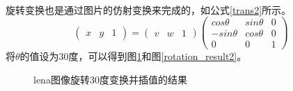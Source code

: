 \documentclass[UTF8]{ctexart}
\newcommand{\upcite}[1]{\textsuperscript{\textsuperscript{\cite{#1}}}}
\begin{document}
旋转变换也是通过图片的仿射变换来完成的，如公式\ref{trans2}所示\upcite{dip}。
\begin{equation}\label{trans2}
	\left( \begin{array}{ccc}
		x & y & 1
		\end{array} \right)
		=
	\left( \begin{array}{ccc}
		v & w & 1
		\end{array} \right) 
	\left( \begin{array}{ccc}
		cos\theta  & sin\theta  & 0  \\
		-sin\theta  & cos\theta & 0 \\
		0 & 0 & 1 
		\end{array} \right)
\end{equation}
将$\theta$的值设为30度，可以得到图\ref{rotation_result1}和图\ref{rotation_result2}。

\begin{figure}[h!]
	\centering
	\hspace{0.1in} 
	\hspace{0.1in} 
	\caption{lena图像旋转30度变换并插值的结果} 
	\label{rotation_result1} %
\end{figure}
\end{document}
